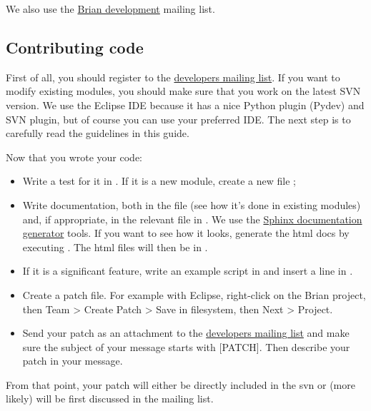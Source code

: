 \documentclass[letterpaper,10pt,english]{manual}
\begin{document}
We also use the \href{http://groups.google.fr/group/brian-development}{Brian development}
mailing list.


\subsection{Contributing code}

First of all, you should register to the
\href{http://groups.google.fr/group/brian-development}{developers mailing list}.
If you want to modify existing modules, you should make sure that you
work on the latest SVN version. We use the Eclipse IDE because it has a nice Python
plugin (Pydev) and SVN plugin, but of course you can use your preferred IDE.
The next step is to carefully read the guidelines in this guide.

Now that you wrote your code:
\begin{itemize}
\item {} 
Write a test for it in . If it is a new module,
create a new file ;

\item {} 
Write documentation, both in the file (see how it's done in existing modules)
and, if appropriate, in the relevant file in . We use the
\href{http://sphinx.pocoo.org/}{Sphinx documentation generator} tools. If you want
to see how it looks, generate the html docs by executing .
The html files will then be in .

\item {} 
If it is a significant feature, write an example script in  and insert a
line in .

\item {} 
Create a patch file. For example with Eclipse, right-click on the Brian project,
then Team \textgreater{} Create Patch \textgreater{} Save in filesystem, then Next \textgreater{} Project.

\item {} 
Send your patch as an attachment to the
\href{http://groups.google.fr/group/brian-development}{developers mailing list}
and make sure the subject of your message starts with {[}PATCH{]}. Then describe your
patch in your message.

\end{itemize}

From that point, your patch will either be directly included in the svn or
(more likely) will be first discussed in the mailing list.
\end{document}
